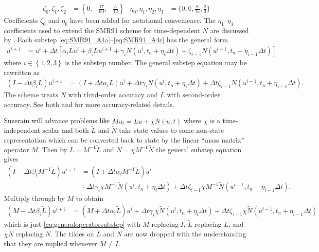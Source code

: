 \documentclass[letterpaper,11pt,nointlimits,reqno,draft]{amsart}
\begin{document}
\begin{align*}
  \zeta_0, \zeta_1, \zeta_2 &= \left\{
    0, -\frac{17}{60}, -\frac{5}{12}
  \right\}
  &
  \eta_0, \eta_1, \eta_2, \eta_3 &= \Biggl\{
    0, 0, \frac{8}{15}, \frac{2}{3}
  \Biggr\}
\end{align*}
Coefficients $\zeta_0$ and $\eta_0$ have been added for notational convenience.
The $\eta_{1}$--$\eta_{3}$ coefficients used to extend the SMR91 scheme for
time-dependent $N$ are discussed by \citet{ShanYang2011}.  Each substep
\eqref{eq:SMR91_A4a}--\eqref{eq:SMR91_A4c} has the general form
\begin{align}
  u^{i+1} &= u^i + \Delta{}t \left[
        \alpha_{i} L u^i
      + \beta_{i}  L u^{i+1}
      + \gamma_{i} N\left( u^{i}, t_{n}+\eta_{i}\Delta{}t \right)
      + \zeta_{i-1} N\left( u^{i-1}, t_{n}+\eta_{i-1}\Delta{}t \right)
  \right]
  \label{eq:generalsubstep}
\end{align}
where $i\in\left\{ 1,2,3 \right\}$ is the substep number.
The general substep equation may be rewritten as
\begin{align}
  \left(I - \Delta{}t\beta_{i}L\right) u^{i+1}
  &=
  \left(I + \Delta{}t\alpha_{i}L\right) u^{i}
  + \Delta{}t\gamma_{i}N\left(u^{i}, t_{n}+\eta_{i}\Delta{}t\right)
  + \Delta{}t\zeta_{i-1}N\left(u^{i-1}, t_{n}+\eta_{i-1}\Delta{}t\right)
  \label{eq:generaloperatorsubstep}
  .
\end{align}
The scheme treats $N$ with third-order accuracy and $L$ with second-order
accuracy.  See both \citet[page 323]{spalart_lowstoragerk} and
\citet[chapter 6]{ShanYang2011} for more accuracy-related details.

Suzerain will advance problems like $Mu_{t}=\tilde{L}u+\chi\tilde{N}\left( u,t
\right)$ where $\chi$ is a time-independent scalar and both $\tilde{L}$ and
$\tilde{N}$ take state values to some non-state representation which can be
converted back to state by the linear ``mass matrix'' operator $M$.  Then by
$L=M^{-1}\tilde{L}$ and $N=\chi{}M^{-1}\tilde{N}$ the general substep equation
gives
\begin{align}
  \left(I - \Delta{}t\beta_{i}M^{-1}\tilde{L}\right) u^{i+1}
  &=
  \left(I + \Delta{}t\alpha_{i}M^{-1}\tilde{L}\right) u^{i}
\\
  &+ \Delta{}t\gamma_{i}\chi{}M^{-1}
    \tilde{N}\left(u^{i}, t_{n}+\eta_{i}\Delta{}t\right)
  + \Delta{}t\zeta_{i-1}\chi{}M^{-1}
    \tilde{N}\left(u^{i-1}, t_{n}+\eta_{i-1}\Delta{}t\right)
  .
\end{align}
Multiply through by $M$ to obtain
\begin{align}
  \left(M - \Delta{}t\beta_{i}\tilde{L}\right) u^{i+1}
  &=
  \left(M + \Delta{}t\alpha_{i}\tilde{L}\right) u^{i}
  + \Delta{}t\gamma_{i}\chi{}
    \tilde{N}\left(u^{i}, t_{n}+\eta_{i}\Delta{}t\right)
  + \Delta{}t\zeta_{i-1}\chi{}
    \tilde{N}\left(u^{i-1}, t_{n}+\eta_{i-1}\Delta{}t\right)
  \label{eq:generaloperatormasssubstep}
\end{align}
which is just \eqref{eq:generaloperatorsubstep} with $M$ replacing $I$,
$\tilde{L}$ replacing $L$, and $\chi{}\tilde{N}$ replacing $N$.  The tildes on
$L$ and $N$ are now dropped with the understanding that they are implied
whenever $M\neq{}I$.
\end{document}
